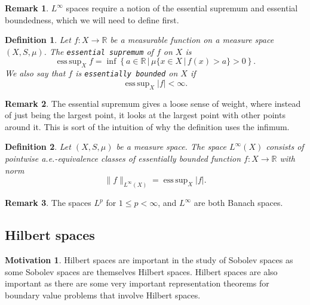 \documentclass[11pt]{article}
\newtheorem{definition}{Definition}
\theoremstyle{definition}
\newtheorem*{remark}{Remark}
\newtheorem*{motivation}{Motivation}
\DeclareMathOperator*{\esssup}{ess\,sup}
\begin{document}
\begin{remark}
	$L^{\infty}$ spaces require a notion of the essential supremum and essential boundedness, which we will need to define first.
\end{remark}

\begin{definition}
	Let $f: X \rightarrow \mathbb{R}$ be a measurable function on a measure space $(X,S,\mu)$.
	The \texttt{essential supremum} of $f$ on $X$ is
	\begin{equation*}
		\esssup_X f = \inf{\left\{a \in \mathbb{R} \,|\, \mu\{ x\in X \,|\, f(x) > a\}>0 \right\}}.
	\end{equation*}
	We also say that $f$ is \texttt{essentially bounded} on $X$ if
	\begin{equation*}
		\esssup_X |f| < \infty.
	\end{equation*}
\end{definition}

\begin{remark}
	The essential supremum gives a loose sense of weight, where instead of just being the largest point,
	it looks at the largest point with other points around it. This is sort of the intuition of why the definition uses the infimum.
\end{remark}

\begin{definition}
	Let $(X,S,\mu)$ be a measure space. The space $L^{\infty}(X)$ consists of pointwise a.e.-equivalence classes of essentially
	bounded function $f : X \rightarrow \mathbb{R}$ with norm
	\begin{equation*}
		\|f\|_{L^{\infty}(X)} = \esssup_X |f|.
	\end{equation*}
\end{definition}

\begin{remark}
	The spaces $L^p$ for $1 \leq p < \infty$, and $L^{\infty}$ are both Banach spaces.
\end{remark}


\newpage

\subsection{Hilbert spaces}
\begin{motivation}
	Hilbert spaces are important in the study of Sobolev spaces as some Sobolev spaces are themselves Hilbert spaces.
	Hilbert spaces are also important as there are some very important representation theorems for boundary value problems that involve Hilbert spaces.
\end{motivation}
\end{document}

